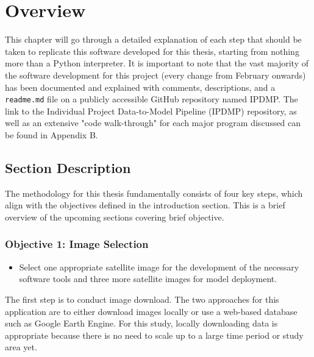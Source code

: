 

\section{Overview}
This chapter will go through a detailed explanation of each step that should be taken to replicate this software developed for this thesis, starting from nothing more than a Python interpreter. It is important to note that the vast majority of the software development for this project (every change from February onwards) has been documented and explained with comments, descriptions, and a \verb|readme.md| file on a publicly accessible GitHub repository named IPDMP. The link to the Individual Project Data-to-Model Pipeline (IPDMP) repository, as well as an extensive "code walk-through" for each major program discussed can be found in Appendix B. 

\subsection{Section Description}
The methodology for this thesis fundamentally consists of four key steps, which align with the objectives defined in the introduction section. This is a brief overview of the upcoming sections covering brief objective. 
\subsubsection{Objective 1: Image Selection}
\begin{itemize}
    \item Select one appropriate satellite image for the development of the necessary software tools and three more satellite images for model deployment. 
\end{itemize}
The first step is to conduct image download. The two approaches for this application are to either download images locally or use a web-based database such as Google Earth Engine. For this study, locally downloading data is appropriate because there is no need to scale up to a large time period or study area yet. 

